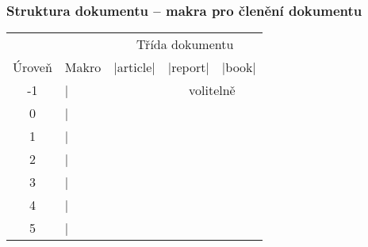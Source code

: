 \begin{frame}[fragile]
	\frametitle{Struktura dokumentu -- makra pro členění dokumentu}
	\begin{center}
		\begin{tabular}{clccc}
			& & \multicolumn{3}{c}{Třída dokumentu}\\
			Úroveň & Makro & |article| & |report| & |book|\\
			\hline
			-1 & |\part| & \XSolidBrush & \multicolumn{2}{c}{volitelně}\\
			 0 & |\chapter| & \XSolidBrush & \Checkmark & \Checkmark \\
			 1 & |\section| & \Checkmark & \Checkmark & \Checkmark\\
			 2 & |\subsection| & \Checkmark & \Checkmark & \Checkmark\\
			 3 & |\subsubsection| & \Checkmark & \Checkmark & \Checkmark \\
			 4 & |\paragraph| & \Checkmark & \Checkmark & \Checkmark\\
			 5 & |\subparagraph| & \Checkmark & \Checkmark & \Checkmark\\
		\end{tabular}
	\end{center}
\end{frame}


